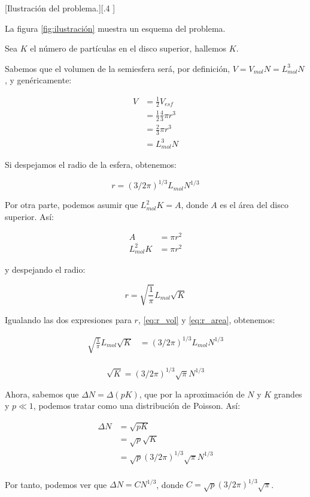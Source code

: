 [Ilustración del problema.][.4  ]

La figura \ref{fig:ilustración} muestra un esquema del problema. 

Sea $K$ el número de partículas en el disco superior, hallemos $K$.

Sabemos que el volumen de la semiesfera será, por definición, $V = V_{mol}N = L_{mol}^3 N$, y genéricamente: 

\begin{align*}
    V &= \frac{1}{2} V_{esf} \\
    &= \frac{1}{2} \frac{4}{3} \pi r^3\\ 
    &= \frac{2}{3} \pi r^3 \\
    &= L_{mol}^3 N 
\end{align*}

Si despejamos el radio de la esfera, obtenemos:

\begin{equation}
    r = (3/2\pi)^{1/3} L_{mol} N^{1/3} \label{eq:r_vol}
\end{equation}

Por otra parte, podemos asumir que $L_{mol}^2 K = A$, donde $A$ es el área del disco superior. Así:

\begin{align*}
    A &= \pi r^2 \\
    L_{mol}^2 K &= \pi r^2  
\end{align*}

y despejando el radio:

\begin{equation}
    r = \sqrt{\frac{1}{\pi}} L_{mol} \sqrt{K} \label{eq:r_area}
\end{equation}

Igualando las dos expresiones para $r$, \ref{eq:r_vol} y \ref{eq:r_area}, obtenemos:

\begin{align*}
    \sqrt{\frac{1}{\pi}} L_{mol} \sqrt{K} &= (3/2\pi)^{1/3} L_{mol} N^{1/3} \\
\end{align*}

\begin{equation}
    \sqrt{K} =  (3/2\pi)^{1/3} \sqrt{\pi} N^{1/3} \label{eq:sqrt_K}
\end{equation}

Ahora, sabemos que $\Delta N = \Delta (pK)$, que por la aproximación de $N$ y $K$ grandes y $p \ll 1$, podemos tratar como una distribución de Poisson. Así:

\begin{align*}
    \Delta N &= \sqrt{pK} \\
    &= \sqrt{p} \sqrt{K} \\
    &= \sqrt{p} (3/2\pi)^{1/3} \sqrt{\pi} N^{1/3} \\
\end{align*}

Por tanto, podemos ver que $\Delta N = C N^{1/3}$, donde $C = \sqrt{p} (3/2\pi)^{1/3} \sqrt{\pi}$.
